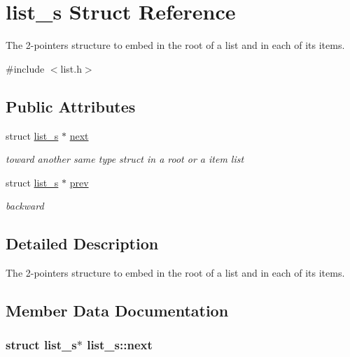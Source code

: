 \hypertarget{structlist__s}{\section{list\-\_\-s Struct Reference}
\label{structlist__s}
}


The 2-\/pointers structure to embed in the root of a list and in each of its items.  




{\ttfamily \#include $<$list.\-h$>$}

\subsection*{Public Attributes}
\begin{DoxyCompactItemize}
\item 
struct \hyperlink{structlist__s}{list\-\_\-s} $\ast$ \hyperlink{structlist__s_a3fe402fa883820f9823c1e47246f9880}{next}
\begin{DoxyCompactList}\small\item\em toward another same type struct in a root or a item list \end{DoxyCompactList}\item 
struct \hyperlink{structlist__s}{list\-\_\-s} $\ast$ \hyperlink{structlist__s_af220645f4ec4f64798bc6d8ea9765185}{prev}
\begin{DoxyCompactList}\small\item\em backward \end{DoxyCompactList}\end{DoxyCompactItemize}


\subsection{Detailed Description}
The 2-\/pointers structure to embed in the root of a list and in each of its items. 

\subsection{Member Data Documentation}
\hypertarget{structlist__s_a3fe402fa883820f9823c1e47246f9880}{
\subsubsection[{next}]{\setlength{\rightskip}{0pt plus 5cm}struct {\bf list\-\_\-s}$\ast$ list\-\_\-s\-::next}}\label{structlist__s_a3fe402fa883820f9823c1e47246f9880}


